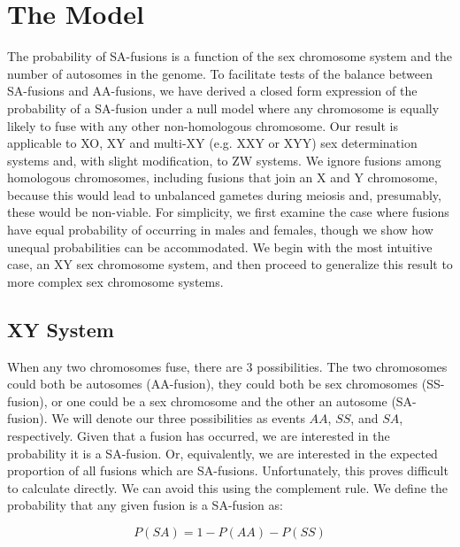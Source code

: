 \documentclass[12pt]{article}
\begin{document}
\section{The Model}
The probability of SA-fusions is a function of the sex chromosome system and the number of autosomes in the genome.
To facilitate tests of the balance between SA-fusions and AA-fusions, we have derived a closed form expression of the probability of a SA-fusion under a null model where any chromosome is equally likely to fuse with any other non-homologous chromosome.
Our result is applicable to XO, XY and multi-XY (e.g. XXY or XYY) sex determination systems and, with slight modification, to ZW systems.
We ignore fusions among homologous chromosomes, including fusions that join an X and Y chromosome, because this would lead to unbalanced gametes during meiosis and, presumably, these would be non-viable.
For simplicity, we first examine the case where fusions have equal probability of occurring in males and females, though we show how unequal probabilities can be accommodated.
We begin with the most intuitive case, an XY sex chromosome system, and then proceed to generalize this result to more complex sex chromosome systems.

\subsection{XY System}
When any two chromosomes fuse, there are 3 possibilities. 
The two chromosomes could both be autosomes (AA-fusion), they could both be sex chromosomes (SS-fusion), or one could be a sex chromosome and the other an autosome (SA-fusion). 
We will denote our three possibilities as events $AA$, $SS$, and $SA$, respectively. 
Given that a fusion has occurred, we are interested in the probability it is a SA-fusion.
Or, equivalently, we are interested in the expected proportion of all fusions which are SA-fusions. 
Unfortunately, this proves difficult to calculate directly. We can avoid this using the complement rule. 
We define the probability that any given fusion is a SA-fusion as:

\begin{equation} \label{eq1}
P(SA)=1-P(AA)-P(SS)
\end{equation}
\end{document}
